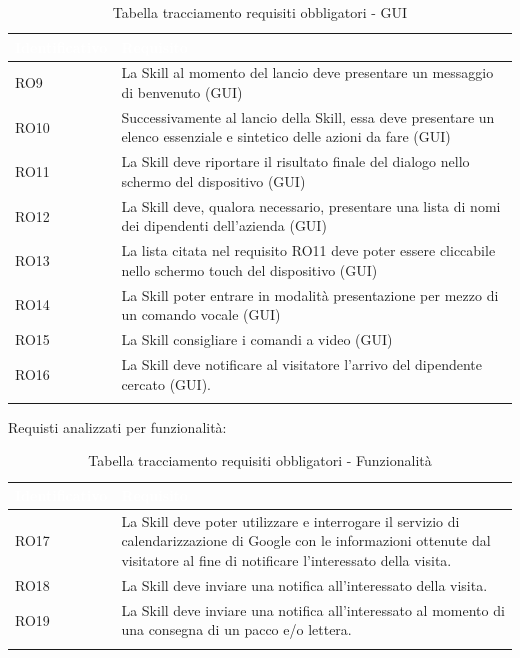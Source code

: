 \begin{center}
	\centering
	\renewcommand{\arraystretch}{1.5}
	\begin{longtable}{  p{2.5cm} p{9.8cm} }
		\rowcolor{tableHead}
		\textbf{\textcolor{white}{Identificativo}} & \textbf{\textcolor{white}{Requisito}} \\
		\endhead  
		RO9 & La Skill al momento del lancio deve presentare un messaggio di benvenuto (GUI) \\
		RO10 & Successivamente al lancio della Skill, essa deve presentare un elenco essenziale e sintetico delle azioni da fare  (GUI) \\
		RO11 & La Skill deve riportare il risultato finale del dialogo nello schermo del dispositivo (GUI) \\
	    RO12 & La Skill deve, qualora necessario, presentare una lista di nomi dei dipendenti dell'azienda (GUI) \\
	    RO13 & La lista citata nel requisito RO11 deve poter essere cliccabile nello schermo touch del dispositivo (GUI) \\
	    RO14 & La Skill poter entrare in modalità presentazione per mezzo di un comando vocale (GUI) \\
	    RO15 & La Skill consigliare i comandi a video (GUI) \\
	    RO16 & La Skill deve notificare al visitatore l'arrivo del dipendente cercato (GUI).\\
		\rowcolor{white}
		\caption{Tabella tracciamento requisiti obbligatori - GUI}
	\end{longtable}
\end{center}
Requisti analizzati per funzionalità:
\begin{center}
	\centering
	\renewcommand{\arraystretch}{1.5}
	\begin{longtable}{  p{2.5cm} p{9.8cm} }
		\rowcolor{tableHead}
		\textbf{\textcolor{white}{Identificativo}} & \textbf{\textcolor{white}{Requisito}} \\
		\endhead  
		RO17 & La Skill deve poter utilizzare e interrogare il servizio di calendarizzazione di Google con le informazioni ottenute dal visitatore al fine di notificare l'interessato della visita.\\
		RO18 & La Skill deve inviare una notifica all'interessato della visita.\\
		RO19 & La Skill deve inviare una notifica all'interessato al momento di una consegna di un pacco e/o lettera.\\
		\rowcolor{white}
		\caption{Tabella tracciamento requisiti obbligatori - Funzionalità}
	\end{longtable}
\end{center}

